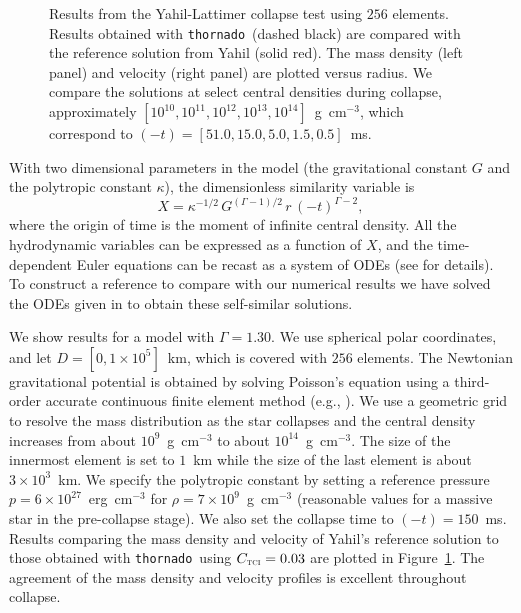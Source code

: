 \documentclass[letterpaper]{jpconf}
\newcommand{\TCI}{\textnormal{\tiny\textsc{TCI}}}
\newcommand{\thornado}{\texttt{thornado}}
\begin{document}
\begin{figure}[h]
\begin{minipage}{18pc}
  \end{minipage}
  \caption{\label{fig:YahilLattimer}Results from the Yahil-Lattimer collapse test using $256$ elements.  Results obtained with \thornado\ (dashed black) are compared with the reference solution from Yahil \cite{yahil_1983} (solid red).  The mass density (left panel) and velocity (right panel) are plotted versus radius.  We compare the solutions at select central densities during collapse, approximately $[10^{10},10^{11},10^{12},10^{13},10^{14}]$~g~cm$^{-3}$, which correspond to $(-t)=[51.0,15.0,5.0,1.5,0.5]$~ms.  }
\end{figure}
With two dimensional parameters in the model (the gravitational constant $G$ and the polytropic constant $\kappa$), the dimensionless similarity variable is
\begin{equation}
  X = \kappa^{-1/2} \, G^{(\Gamma-1)/2} \, r \, (-t)^{\Gamma-2},
\end{equation}
where the origin of time is the moment of infinite central density.  
All the hydrodynamic variables can be expressed as a function of $X$, and the time-dependent Euler equations can be recast as a system of ODEs (see \cite{yahil_1983} for details).  
To construct a reference to compare with our numerical results we have solved the ODEs given in \cite{yahil_1983} to obtain these self-similar solutions.  

We show results for a model with $\Gamma=1.30$.  
We use spherical polar coordinates, and let $D=[0,1\times10^{5}]$~km, which is covered with $256$ elements.  
The Newtonian gravitational potential is obtained by solving Poisson's equation using a third-order accurate continuous finite element method (e.g., \cite{brennerScott_2008}).  
We use a geometric grid to resolve the mass distribution as the star collapses and the central density increases from about $10^{9}$~g~cm$^{-3}$ to about $10^{14}$~g~cm$^{-3}$.  
The size of the innermost element is set to $1$~km while the size of the last element is about $3\times10^{3}$~km.  
We specify the polytropic constant by setting a reference pressure $p=6\times10^{27}$~erg~cm$^{-3}$ for $\rho=7\times10^{9}$~g~cm$^{-3}$ (reasonable values for a massive star in the pre-collapse stage).  
We also set the collapse time to $(-t)=150$~ms.  
Results comparing the mass density and velocity of Yahil's reference solution to those obtained with \thornado\ using $C_{\TCI}=0.03$ are plotted in Figure~\ref{fig:YahilLattimer}.  
The agreement of the mass density and velocity profiles is excellent throughout collapse.  
\end{document}
